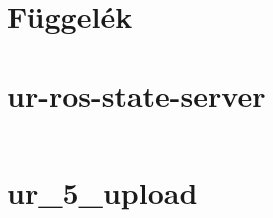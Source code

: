 \documentclass[12pt,a4paper]{article}
\begin{document}
	
    \makebibliography
	\makefigures
	\maketables
	
	\appendix
	
	\section*{Függelék}
	\begin{appendices}
		\section{ur-ros-state-server} 
		\label{appendix:ur-ros-state-server}
		\inputminted{js}{code/ur5_state_server.js}
		
		\pagebreak
		
		\section{ur\_5\_upload}
		\label{appendix:ur_5_upload}
		\inputminted{xml}{code/ur5_upload.launch}
	\end{appendices}
\end{document}
